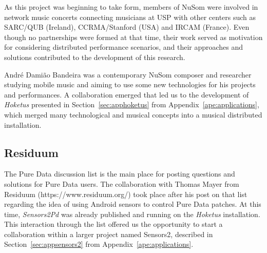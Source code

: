 As this project was beginning to take form, members of NuSom were involved in network music concerts connecting musicians at USP with other centers such as SARC/QUB (Ireland), CCRMA/Stanford (USA) and IRCAM (France).
Even though no partnerships were formed at that time, their work served as motivation for considering distributed performance scenarios, and their approaches and solutions contributed to the development of this research.

André Damião Bandeira was a contemporary NuSom composer and researcher studying mobile music and aiming to use some new technologies for his projects and performances.
A collaboration emerged that led us to the development of \textit{Hoketus} presented in Section~\ref{sec:apphoketus} from Appendix~\ref{ape:applications}, which merged many technological and musical concepts into a musical distributed installation.



\subsection*{Residuum}

The Pure Data discussion list is the main place for posting questions and solutions for Pure Data users.
The collaboration with Thomas Mayer from Residuum (https://www.residuum.org/) took place after his post on that list regarding the idea of using Android sensors to control Pure Data patches.
At this time, \textit{Sensors2Pd} was already published and running on the \textit{Hoketus} installation.
This interaction through the list offered us the opportunity to start a collaboration within a larger project named Sensors2, described in Section~\ref{sec:appsensors2} from Appendix~\ref{ape:applications}.

